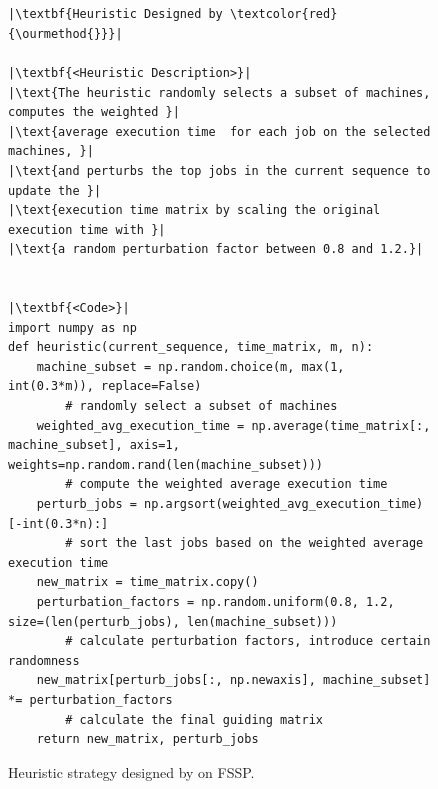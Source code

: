 \begin{figure}[ht]
\caption{Heuristic strategy designed by \ourmethod{} on FSSP. }~\label{fig:heuristic_fssp}

\begin{minipage}{0.99\linewidth}
\begin{lstlisting}

|\textbf{Heuristic Designed by \textcolor{red}{\ourmethod{}}}|

|\textbf{<Heuristic Description>}|
|\text{The heuristic randomly selects a subset of machines, computes the weighted }|
|\text{average execution time  for each job on the selected machines, }|
|\text{and perturbs the top jobs in the current sequence to update the }|
|\text{execution time matrix by scaling the original execution time with }|
|\text{a random perturbation factor between 0.8 and 1.2.}|


|\textbf{<Code>}|
import numpy as np
def heuristic(current_sequence, time_matrix, m, n):
    machine_subset = np.random.choice(m, max(1, int(0.3*m)), replace=False)
        # randomly select a subset of machines
    weighted_avg_execution_time = np.average(time_matrix[:, machine_subset], axis=1, weights=np.random.rand(len(machine_subset)))
        # compute the weighted average execution time
    perturb_jobs = np.argsort(weighted_avg_execution_time)[-int(0.3*n):]
        # sort the last jobs based on the weighted average execution time
    new_matrix = time_matrix.copy()
    perturbation_factors = np.random.uniform(0.8, 1.2, size=(len(perturb_jobs), len(machine_subset)))
        # calculate perturbation factors, introduce certain randomness
    new_matrix[perturb_jobs[:, np.newaxis], machine_subset] *= perturbation_factors
        # calculate the final guiding matrix
    return new_matrix, perturb_jobs
\end{lstlisting}
\end{minipage}
\end{figure}



